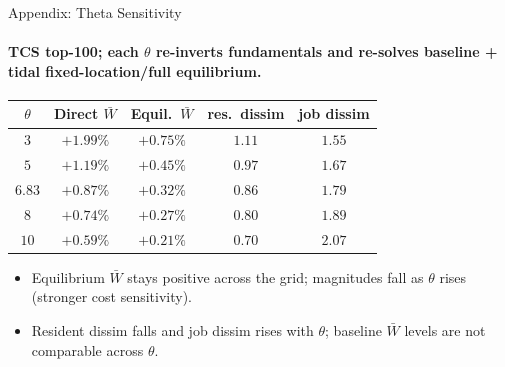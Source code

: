 \documentclass[11pt,aspectratio=169]{beamer}
\newcommand{\navback}[1]{\par\vspace{0.35em}\noindent\hfill\hyperlink{#1}{\beamerreturnbutton{back}}}
\begin{document}
\begin{frame}[label=appsens_theta]{Appendix: Theta Sensitivity}
\framesubtitle{TCS top-100; each $\theta$ re-inverts fundamentals and re-solves baseline + tidal fixed-location/full equilibrium.}
\scriptsize
\begin{center}
\renewcommand{\arraystretch}{1.3}
\setlength{\tabcolsep}{12pt}
\begin{tabular}{ccccc}
\toprule
$\theta$ & Direct $\bar W$ & Equil.\ $\bar W$ & res.\ dissim & job dissim \\
\midrule
$3$ & $+1.99\%$ & $+0.75\%$ & $1.11$ & $1.55$ \\
$5$ & $+1.19\%$ & $+0.45\%$ & $0.97$ & $1.67$ \\
$\mathbf{6.83}$ & $\mathbf{+0.87\%}$ & $\mathbf{+0.32\%}$ & $\mathbf{0.86}$ & $\mathbf{1.79}$ \\
$8$ & $+0.74\%$ & $+0.27\%$ & $0.80$ & $1.89$ \\
$10$ & $+0.59\%$ & $+0.21\%$ & $0.70$ & $2.07$ \\
\bottomrule
\end{tabular}
\end{center}
\vspace{0.4em}
\begin{itemize}\footnotesize
  \item Equilibrium $\bar W$ stays positive across the grid; magnitudes fall as $\theta$ rises (stronger cost sensitivity).
  \item Resident dissim falls and job dissim rises with $\theta$; baseline $\bar W$ levels are not comparable across $\theta$.
\end{itemize}
\navback{appsens}
\end{frame}
\end{document}
